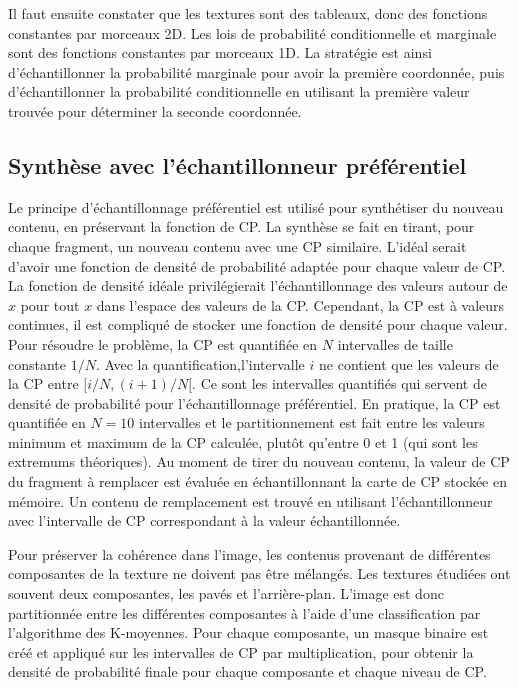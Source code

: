 Il faut ensuite constater que les textures sont des tableaux, donc des fonctions constantes par morceaux 2D. Les lois de probabilité conditionnelle et marginale sont des fonctions constantes par morceaux 1D. La stratégie est ainsi d'échantillonner la probabilité marginale pour avoir la première coordonnée, puis d'échantillonner la probabilité conditionnelle en utilisant la première valeur trouvée pour déterminer la seconde coordonnée.

\subsection{Synthèse avec l'échantillonneur préférentiel}

Le principe d'échantillonnage préférentiel est utilisé pour synthétiser du nouveau contenu, en préservant la fonction de CP. La synthèse se fait en tirant, pour chaque fragment, un nouveau contenu avec une CP similaire. L'idéal serait d'avoir une fonction de densité de probabilité adaptée pour chaque valeur de CP. La fonction de densité idéale privilégierait l'échantillonnage des valeurs autour de $x$ pour tout $x$ dans l'espace des valeurs de la CP. Cependant, la CP est à valeurs continues, il est compliqué de stocker une fonction de densité pour chaque valeur. Pour résoudre le problème, la CP est quantifiée en $N$ intervalles de taille constante $1/N$. Avec la quantification,l'intervalle $i$ ne contient que les valeurs de la CP entre $[i/N, (i+1)/N[$. Ce sont les intervalles quantifiés qui servent de densité de probabilité pour l'échantillonnage préférentiel. En pratique, la CP est quantifiée en $N=10$ intervalles et le partitionnement est fait entre les valeurs minimum et maximum de la CP calculée, plutôt qu'entre 0 et 1 (qui sont les extremums théoriques). Au moment de tirer du nouveau contenu, la valeur de CP du fragment à remplacer est évaluée en échantillonnant la carte de CP stockée en mémoire. Un contenu de remplacement est trouvé en utilisant l'échantillonneur avec l'intervalle de CP correspondant à la valeur échantillonnée.

\bigskip

Pour préserver la cohérence dans l'image, les contenus provenant de différentes composantes de la texture ne doivent pas être mélangés. Les textures étudiées ont souvent deux composantes, les pavés et l'arrière-plan. L'image est donc partitionnée entre les différentes composantes à l'aide d'une classification par l'algorithme des K-moyennes. Pour chaque composante, un masque binaire est créé et appliqué sur les intervalles de CP par multiplication, pour obtenir la densité de probabilité finale pour chaque composante et chaque niveau de CP.


